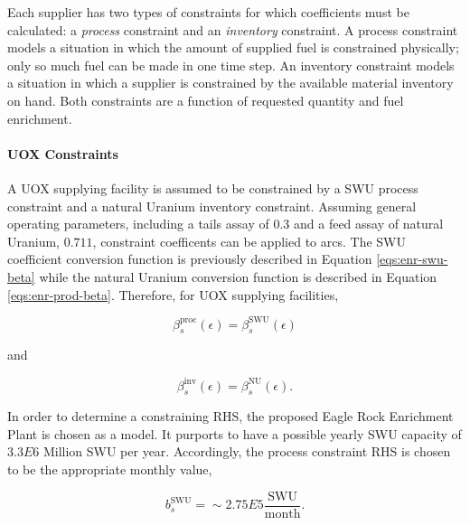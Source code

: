 Each supplier has two types of constraints for which coefficients must be
calculated: a \textit{process} constraint and an \textit{inventory} constraint. A
process constraint models a situation in which the amount of supplied fuel is
constrained physically; only so much fuel can be made in one time step. An
inventory constraint models a situation in which a supplier is constrained by
the available material inventory on hand. Both constraints are a function of
requested quantity and fuel enrichment.

\paragraph{UOX Constraints}

A UOX supplying facility is assumed to be constrained by a SWU process
constraint and a natural Uranium inventory constraint. Assuming general
operating parameters, including a tails assay of $0.3$ and a feed assay of
natural Uranium, $0.711$, constraint coefficents can be applied to arcs. The SWU
coefficient conversion function is previously described in Equation
\ref{eqs:enr-swu-beta} while the natural Uranium conversion function is
described in Equation \ref{eqs:enr-prod-beta}. Therefore, for UOX supplying
facilities,

\begin{equation}
\beta^{\text{proc}}_s(\epsilon) = \beta^{\text{SWU}}_s(\epsilon) 
\end{equation}

and

\begin{equation}
\beta^{\text{inv}}_s(\epsilon) = \beta^{\text{NU}}_s(\epsilon). 
\end{equation}

In order to determine a constraining RHS, the proposed Eagle Rock Enrichment
Plant is chosen as a model. It purports to have a possible yearly SWU capacity
of $3.3E6$ Million SWU per year. Accordingly, the process constraint RHS is
chosen to be the appropriate monthly value,

\begin{equation}
b^{\text{SWU}}_s = \sim 2.75E5 \frac{\text{SWU}}{\text{month}}.
\end{equation}

